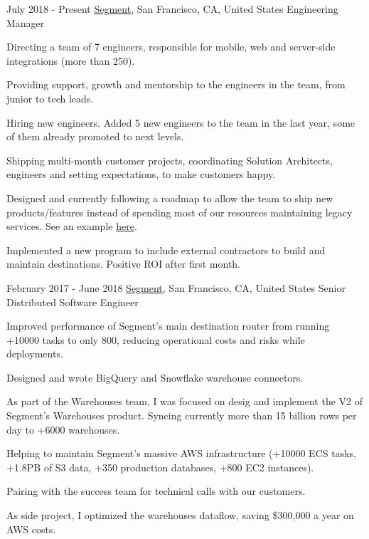 
\experience
  {July 2018 - Present}
  {\href{https://segment.com}{Segment}, San Francisco, CA, United States}
  {Engineering Manager}
  {\vspace{-1em}\begin{rlist}
    \item Directing a team of 7 engineers, responsible for mobile, web and server-side integrations (more than 250).
    \item Providing support, growth and mentorship to the engineers in the team, from junior to tech leads.
    \item Hiring new engineers. Added 5 new engineers to the team in the last year, some of them already promoted to next levels.
    \item Shipping multi-month customer projects, coordinating Solution Architects, engineers and setting expectations, to make customers happy.
    \item Designed and currently following a roadmap to allow the team to ship new products/features instead of spending most 
    of our resources maintaining legacy services. See an example \href{https://segment.com/blog/unleashing-the-power-of-raw-data-with-amazon-lambda/}{here}.
    \item Implemented a new program to include external contractors to build and maintain destinations. Positive ROI after first month.
  \end{rlist}}
  
\experience
  {February 2017 - June 2018}
  {\href{https://segment.com}{Segment}, San Francisco, CA, United States}
  {Senior Distributed Software Engineer}
  {\vspace{-1em}\begin{rlist}
    \item Improved performance of Segment's main destination router from running +10000 tasks to only 800, reducing operational
    costs and risks while deployments.
    \item Designed and wrote BigQuery and Snowflake warehouse connectors.
    \item As part of the Warehouses team, I was focused on desig and implement the V2 of Segment's Warehouses 
    product. Syncing currently more than 15 billion rows per day to +6000 warehouses.
    \item Helping to maintain Segment's massive AWS infrastructure (+10000 ECS tasks, +1.8PB of S3 data,
    +350 production databases, +800 EC2 instances).
    \item Pairing with the success team for technical calls with our customers. 
    \item As side project, I optimized the warehouses dataflow, saving \$300,000 a year on AWS costs.
  \end{rlist}}

